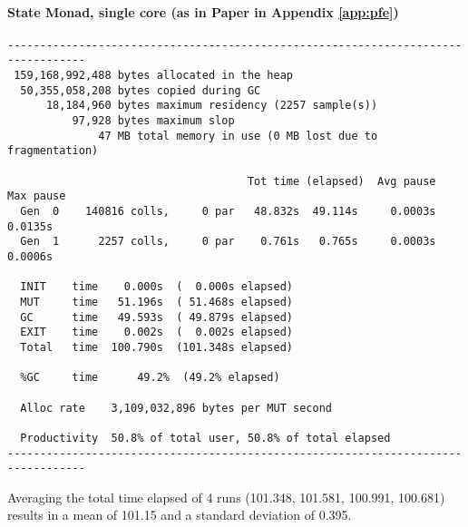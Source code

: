 \paragraph{State Monad, single core (as in Paper in Appendix \ref{app:pfe})}
\begin{verbatim}
----------------------------------------------------------------------------------
 159,168,992,488 bytes allocated in the heap
  50,355,058,208 bytes copied during GC
      18,184,960 bytes maximum residency (2257 sample(s))
          97,928 bytes maximum slop
              47 MB total memory in use (0 MB lost due to fragmentation)

                                     Tot time (elapsed)  Avg pause  Max pause
  Gen  0    140816 colls,     0 par   48.832s  49.114s     0.0003s    0.0135s
  Gen  1      2257 colls,     0 par    0.761s   0.765s     0.0003s    0.0006s

  INIT    time    0.000s  (  0.000s elapsed)
  MUT     time   51.196s  ( 51.468s elapsed)
  GC      time   49.593s  ( 49.879s elapsed)
  EXIT    time    0.002s  (  0.002s elapsed)
  Total   time  100.790s  (101.348s elapsed)

  %GC     time      49.2%  (49.2% elapsed)

  Alloc rate    3,109,032,896 bytes per MUT second

  Productivity  50.8% of total user, 50.8% of total elapsed
----------------------------------------------------------------------------------
\end{verbatim}

Averaging the total time elapsed of 4 runs (101.348, 101.581, 100.991, 100.681) results in a mean of 101.15 and a standard deviation of 0.395.

